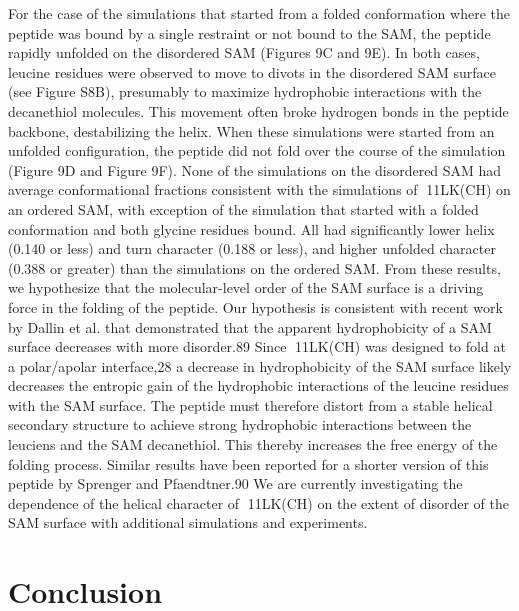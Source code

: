 For the case of the simulations that started from a folded conformation where the peptide was bound by a single restraint or not bound to the SAM, the peptide rapidly unfolded on the disordered SAM (Figures 9C and 9E). In both cases, leucine residues were observed to move to divots in the disordered SAM surface (see Figure S8B), presumably to maximize hydrophobic interactions with the decanethiol molecules. This movement often broke hydrogen bonds in the peptide backbone, destabilizing the helix. When these simulations were started from an unfolded configuration, the peptide did not fold over the course of the simulation (Figure 9D and Figure 9F). None of the simulations on the disordered SAM had average conformational fractions consistent with the simulations of 11LK(CH) on an ordered SAM, with exception of the simulation that started with a folded conformation and both glycine residues bound. All had significantly lower helix (0.140 or less) and turn character (0.188 or less), and higher unfolded character (0.388 or greater) than the simulations on the ordered SAM. From these results, we hypothesize that the molecular-level order of the SAM surface is a driving force in the folding of the peptide. Our hypothesis is consistent with recent work by Dallin et al. that demonstrated that the apparent hydrophobicity of a SAM surface decreases with more disorder.89 Since 11LK(CH) was designed to fold at a polar/apolar interface,28 a decrease in hydrophobicity of the SAM surface likely decreases the entropic gain of the hydrophobic interactions of the leucine residues with the SAM surface. The peptide must therefore distort from a stable helical secondary structure to achieve strong hydrophobic interactions between the leuciens and the SAM decanethiol. This thereby increases the free energy of the folding process. Similar results have been reported for a shorter version of this peptide by Sprenger and Pfaendtner.90 We are currently investigating the dependence of the helical character of 11LK(CH) on the extent of disorder of the SAM surface with additional simulations and experiments.

\section{Conclusion}
%

